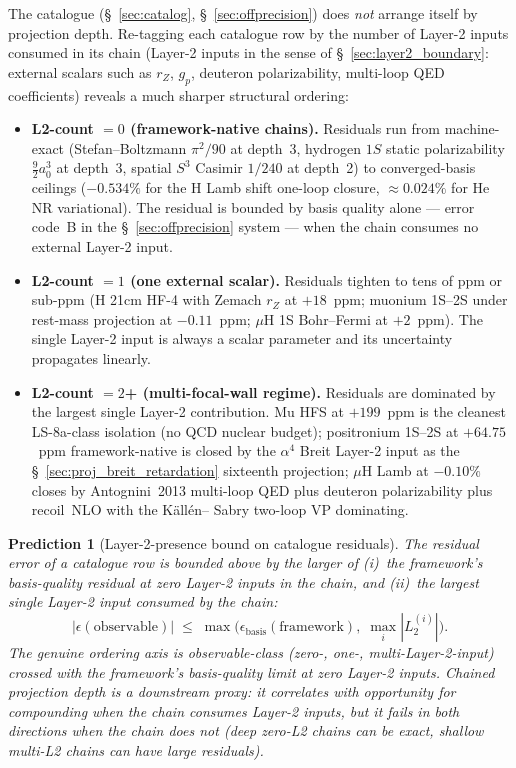 \documentclass[11pt]{article}
\newtheorem{prediction}{Prediction}
\begin{document}
The catalogue (\S~\ref{sec:catalog}, \S~\ref{sec:offprecision}) does
\emph{not} arrange itself by projection depth.  Re-tagging each
catalogue row by the number of Layer-2 inputs consumed in its chain
(Layer-2 inputs in the sense of \S~\ref{sec:layer2_boundary}:
external scalars such as $r_Z$, $g_p$, deuteron polarizability,
multi-loop QED coefficients) reveals a much sharper structural
ordering:
\begin{itemize}\setlength\itemsep{0pt}
\item \textbf{L2-count $= 0$ (framework-native chains).}  Residuals
run from machine-exact (Stefan--Boltzmann $\pi^2/90$ at depth~3,
hydrogen $1S$ static polarizability $\tfrac{9}{2}a_0^3$ at depth~3,
spatial $S^3$ Casimir $1/240$ at depth~2) to converged-basis
ceilings ($-0.534\%$ for the H Lamb shift one-loop closure,
$\approx 0.024\%$ for He NR variational).  The residual is bounded
by basis quality alone --- error code~B in the
\S~\ref{sec:offprecision} system --- when the chain consumes no
external Layer-2 input.
\item \textbf{L2-count $= 1$ (one external scalar).}  Residuals
tighten to tens of ppm or sub-ppm (H 21cm HF-4 with Zemach $r_Z$ at
$+18$~ppm; muonium 1S--2S under rest-mass projection at $-0.11$~ppm;
$\mu$H 1S Bohr--Fermi at $+2$~ppm).  The single Layer-2 input is
always a scalar parameter and its uncertainty propagates linearly.
\item \textbf{L2-count $= 2$+ (multi-focal-wall regime).}  Residuals
are dominated by the largest single Layer-2 contribution.  Mu HFS
at $+199$~ppm is the cleanest LS-8a-class isolation (no QCD nuclear
budget); positronium 1S--2S at $+64.75$~ppm framework-native is
closed by the $\alpha^4$ Breit Layer-2 input as the
\S~\ref{sec:proj_breit_retardation} sixteenth projection;
$\mu$H Lamb at $-0.10\%$ closes by Antognini~2013 multi-loop QED
plus deuteron polarizability plus recoil~NLO with the K\"all\'en--
Sabry two-loop VP dominating.
\end{itemize}

\begin{prediction}[Layer-2-presence bound on catalogue residuals]
\label{pred:l2_presence}
The residual error of a catalogue row is bounded above by the
larger of (i)~the framework's basis-quality residual at zero
Layer-2 inputs in the chain, and (ii)~the largest single Layer-2
input consumed by the chain:
\begin{equation*}
|\epsilon(\text{observable})| \;\leq\;
\max\!\bigl(\epsilon_\text{basis}(\text{framework}),
\;\max_i |L_2^{(i)}|\bigr).
\end{equation*}
The genuine ordering axis is observable-class (zero-, one-,
multi-Layer-2-input) crossed with the framework's basis-quality
limit at zero Layer-2 inputs.  Chained projection depth is a
downstream proxy: it correlates with opportunity for compounding
when the chain consumes Layer-2 inputs, but it fails in both
directions when the chain does not (deep zero-L2 chains can be
exact, shallow multi-L2 chains can have large residuals).
\end{prediction}
\end{document}
